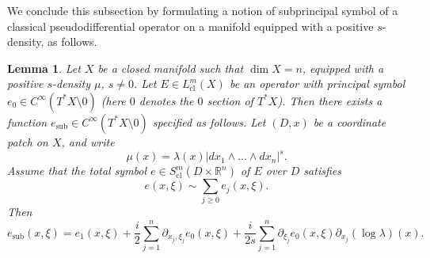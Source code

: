 \documentclass{article}
\newtheorem{lemma}[theorem]{Lemma}
\newcommand{\RR}{\mathbb R}
\DeclareMathOperator{\sub}{sub}
\DeclareMathOperator{\cl}{cl}
\begin{document}
We conclude this subsection by formulating a notion of subprincipal symbol of a classical pseudodifferential operator on a manifold equipped with a positive $s$-density, as follows.
%
\begin{lemma}\label{density_subprinc_symb} Let $X$ be a closed manifold such that $\dim X = n$, equipped with a positive $s$-density $\mu$, $s \ne 0$. Let $E \in L^m_{\cl}(X)$ be an operator with principal symbol $e_0 \in C^\infty(T^*X\setminus 0)$ (here $0$ denotes the $0$ section of $T^*X$). Then there exists a function $e_{\sub} \in C^\infty(T^*X\setminus 0)$ specified as follows. Let $(D, x)$ be a coordinate patch on $X$, and write $$\mu(x) = \lambda(x) |dx_1 \wedge ...\wedge dx_n|^s.$$
%
Assume that the total symbol $e\in S^m_{\cl}(D\times \RR^n)$ of $E$ over $D$ satisfies $$e(x,\xi) \sim \sum_{j \ge 0} e_j(x,\xi).$$
%
Then $$e_{\sub}(x,\xi) = e_1(x,\xi) + \frac i 2 \sum_{j=1}^n \partial_{x_j, \xi_j} e_0(x,\xi) +\frac i {2s}\sum_{j=1}^n \partial_{\xi_j} e_0(x,\xi) \partial_{x_j}(\log \lambda)(x).$$
\end{lemma}
%
\end{document}
